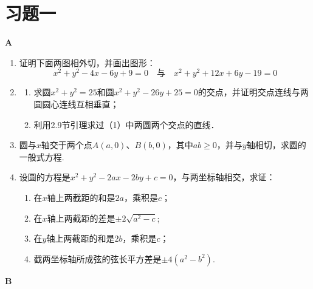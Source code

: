 \section*{习题一}
\begin{center}
    \bfseries A
\end{center}

\begin{enumerate}
    \item 证明下面两图相外切，并画出图形：
    \[x^2+y^2-4x-6y+9=0\quad \text{与}\quad x^2+y^2+12x+6y-19=0\]
\item \begin{enumerate}[(1)]
    \item 求圆$x^2+y^2=25$和圆$x^2+y^2-26y+25=0$的交点，并证明交点连线与两圆圆心连线互相垂直；
    \item 利用2.9节引理求过（1）中两圆两个交点的直线．
\end{enumerate}   
    \item 圆与$x$轴交于两个点$A(a,0)$、$B(b,0)$，其中$ab\ge 0$，并与$y$轴相切，求圆的一般式方程.
    \item 设圆的方程是$x^2+y^2-2ax-2by+c=0$，与两坐标轴相交，求证：
\begin{enumerate}[(1)]
\item 在$x$轴上两截距的和是$2a$，乘积是$c$；
\item 在$x$轴上两截距的差是$\pm 2\sqrt{a^2-c}$;
\item 在$y$轴上两截距的和是$2b$，乘积是$c$；
\item 截两坐标轴所成弦的弦长平方差是$\pm 4(a^2-b^2)$.
\end{enumerate}

\end{enumerate}

\begin{center}
    \bfseries B
\end{center}


